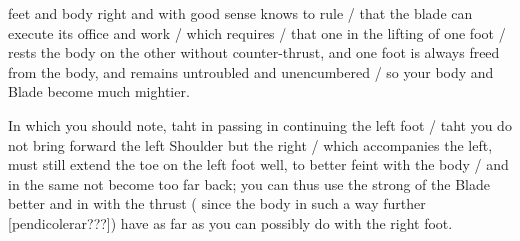 \newpage


\newpage



feet and body right and with good sense knows to rule / that the 
blade can execute its office and work / which requires / that one in the
lifting of one foot / rests the body on the other without
counter-thrust, and one foot is
always freed from the body, and remains untroubled and unencumbered /
so your body and Blade become much mightier.


In which you should note, taht in passing in continuing the left foot
/ taht you do not bring forward the left Shoulder but the right /
which accompanies the left, must still extend the toe on the left foot
well, to better feint with the body / and in the same not become too
far back; you can thus use the strong of the Blade better and in with
the thrust ( since the body in such a way further [pendicolerar???])
have as far as you can possibly do with the right foot.


